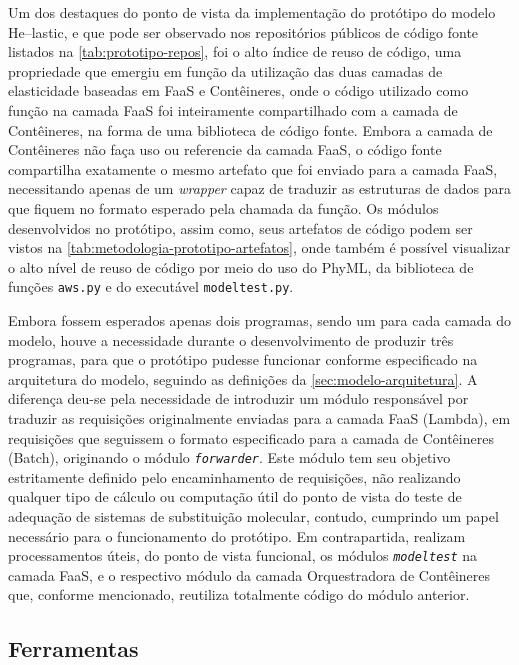 \documentclass[english,brazilian]{UNISINOSmonografia} %
\begin{document}
Um dos destaques do ponto de vista da implementação do protótipo do modelo \textsf{He}--lastic, e que pode ser observado nos repositórios públicos de código fonte listados na \autoref{tab:prototipo-repos}, foi o alto índice de reuso de código, uma propriedade que emergiu em função da utilização das duas camadas de elasticidade baseadas em FaaS e Contêineres, onde o código utilizado como função na camada FaaS foi inteiramente compartilhado com a camada de Contêineres, na forma de uma biblioteca de código fonte.
%
Embora a camada de Contêineres não faça uso ou referencie da camada FaaS, o código fonte compartilha exatamente o mesmo artefato que foi enviado para a camada FaaS, necessitando apenas de um \textit{wrapper} capaz de traduzir as estruturas de dados para que fiquem no formato esperado pela chamada da função.
%
Os módulos desenvolvidos no protótipo, assim como, seus artefatos de código podem ser vistos na \autoref{tab:metodologia-prototipo-artefatos}, onde também é possível visualizar o alto nível de reuso de código por meio do uso do PhyML, da biblioteca de funções \texttt{aws.py} e do executável \texttt{modeltest.py}.


Embora fossem esperados apenas dois programas, sendo um para cada camada do modelo, houve a necessidade durante o desenvolvimento de produzir três programas, para que o protótipo pudesse funcionar conforme especificado na arquitetura do modelo, seguindo as definições da \autoref{sec:modelo-arquitetura}.
%
A diferença deu-se pela necessidade de introduzir um módulo responsável por traduzir as requisições originalmente enviadas para a camada FaaS (Lambda), em requisições que seguissem o formato especificado para a camada de Contêineres (Batch), originando o módulo \textit{\texttt{forwarder}}.
%
Este módulo tem seu objetivo estritamente definido pelo encaminhamento de requisições, não realizando qualquer tipo de cálculo ou computação útil do ponto de vista do teste de adequação de sistemas de substituição molecular, contudo, cumprindo um papel necessário para o funcionamento do protótipo.
%
Em contrapartida, realizam processamentos úteis, do ponto de vista funcional, os módulos \textit{\texttt{modeltest}} na camada FaaS, e o respectivo módulo da camada Orquestradora de Contêineres que, conforme mencionado, reutiliza totalmente código do módulo anterior.







\subsection{Ferramentas}
\end{document}
